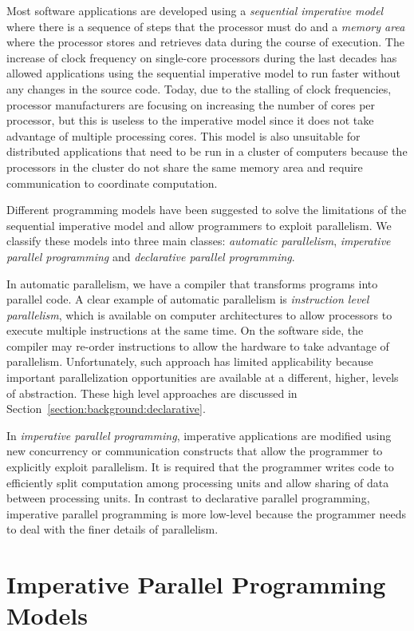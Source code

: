 Most software applications are developed using a \emph{sequential imperative
model} where there is a sequence of steps that the processor must do and a
\emph{memory area} where the processor stores and retrieves data during the
course of execution.  The increase of clock frequency on single-core processors
during the last decades has allowed applications using the sequential imperative model to
run faster without any changes in the source code. Today, due to the stalling of
clock frequencies, processor manufacturers are focusing on increasing the number
of cores per processor, but this is useless to the imperative model since it
does not take advantage of multiple processing cores. This model is also
unsuitable for distributed applications that need to be run in a cluster of
computers because the processors in the cluster do not share the same memory
area and require communication to coordinate computation.

Different programming models have been suggested to solve the limitations of the
sequential imperative model and allow programmers to exploit parallelism. We
classify these models into three main classes: \emph{automatic parallelism},
\emph{imperative parallel programming} and
\emph{declarative parallel programming}.

In automatic parallelism, we have a compiler that transforms programs into
parallel code. A clear example of automatic parallelism is \emph{instruction
level parallelism}, which is available on computer architectures to allow
processors to execute multiple instructions at the same time. On the software
side, the compiler may re-order instructions to allow the hardware to take
advantage of parallelism. Unfortunately, such approach has limited applicability
because important parallelization opportunities are available at a different,
higher, levels of abstraction. These high level approaches are discussed in
Section~\ref{section:background:declarative}.

In \emph{imperative parallel programming}, imperative applications are modified
using new concurrency or communication constructs that allow the programmer to
explicitly exploit parallelism. It is required that the programmer writes code
to efficiently split computation among processing units and allow sharing of
data between processing units. In contrast to declarative parallel programming,
imperative parallel programming is more low-level because the programmer needs
to deal with the finer details of parallelism.

\section{Imperative Parallel Programming Models}

